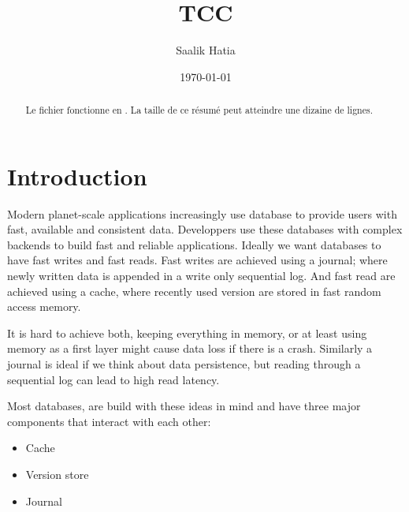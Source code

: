 \documentclass[parallelisme]{compas2022}
\begin{document}
\title{TCC}

\author{Saalik Hatia}%

\address{Université Pierre et Marie Curie\\
Laboratoire LIP6 \\
4, place jussieu\\
75005 Paris - France\\
saalik.hatia@lip6.fr}

\date{\today}

\maketitle

\begin{abstract}
  Le fichier fonctionne en \LaTeXe. La taille
  de ce résumé peut atteindre une dizaine de lignes.
\end{abstract}


\section{Introduction}

Modern planet-scale applications increasingly use database to provide users with fast, available and consistent data.
Developpers use these databases with complex backends to build fast and reliable applications.
Ideally we want databases to have fast writes and fast reads.
Fast writes are achieved using a journal; where newly written data is appended in a write only sequential log.
And fast read are achieved using a cache, where recently used version are stored in fast random access memory.

It is hard to achieve both, keeping everything in memory, or at least using memory as a first layer might cause data loss if there is a crash.
Similarly a journal is ideal if we think about data persistence, but reading through a sequential log can lead to high read latency.

Most databases, are build with these ideas in mind and have three major components that interact with each other:
\begin{itemize}
  \item Cache
  \item Version store
  \item Journal
\end{itemize}
\end{document}
